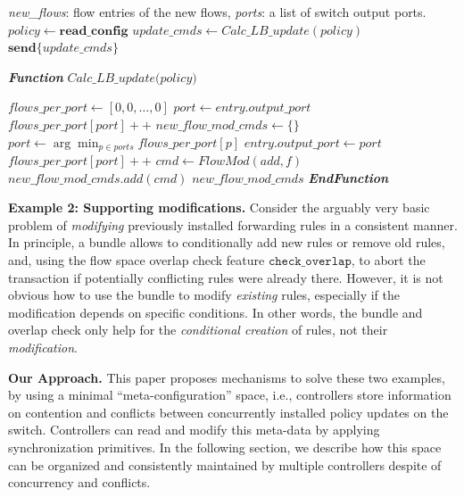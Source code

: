 \documentclass[conference]{sigcomm-alternate}
\newcommand{\checko}{\texttt{check\_overlap}\xspace}
\newcommand{\petr}[1]{\textit{\textcolor{blue}{[petr]: #1}}} %
\begin{document}
\begin{algorithm}[t]
    \caption{$\textit{Naive Flow Balancing}$}
    \label{alg:naive-lb}
\begin{algorithmic}[1]

    \Require \emph{new\_flows}: flow entries of the new flows, \emph{ports}: a list of switch output ports.
    \State $policy \gets \textbf{read\_config}$
    \State $update\_cmds \gets Calc\_LB\_update(policy)$ %
    \State $\textbf{send}\{update\_cmds\}$
    \Statex

    \Statex \emph{\bf Function} $\textit{Calc\_LB\_update(policy)}$ %

	\State $flows\_per\_port \gets [0, 0, \ldots, 0]$
	    \State $port \gets entry.output\_port$
	    \State $flows\_per\_port[port]++$
	\EndFor
	\State $new\_flow\_mod\_cmds \gets \{\}$
	    \State $port \gets \arg\min_{p\in ports} flows\_per\_port[p]$
	    \State $entry.output\_port \gets port$
	    \State $flows\_per\_port[port]++$
	    \State $cmd \gets FlowMod(add,f)$
	    \State $new\_flow\_mod\_cmds.add(cmd)$
	\EndFor
	\Return $new\_flow\_mod\_cmds$
    \State \emph{\bf EndFunction}
\end{algorithmic}
\end{algorithm}


\vspace{2mm}
\noindent\textbf{Example 2: Supporting modifications.}
Consider the arguably very basic problem of \emph{modifying} previously installed forwarding rules
in a consistent manner.
In principle, a bundle allows to conditionally add new rules or remove
old rules, and, using the flow space overlap
check feature $\checko$, to abort the transaction if potentially conflicting
rules were already there. However, it is not obvious how  
to use the bundle to
modify \emph{existing} rules, especially if the modification depends on 
specific conditions.
In other words, the bundle and overlap check only help
for the \emph{conditional creation} of rules, not their \emph{modification}.

\vspace{2mm}
\noindent\textbf{Our Approach.}
This paper proposes mechanisms to solve these two examples,
by using a minimal 
``meta-configuration'' space, i.e., controllers store information 
on contention and conflicts between
concurrently installed policy updates on the switch. Controllers can read and modify
this meta-data by applying synchronization primitives.
In the following section, we
describe how this space can be organized and consistently maintained
by multiple controllers despite of concurrency and conflicts.
\end{document}
